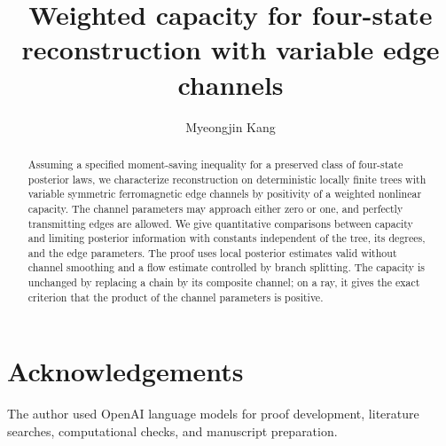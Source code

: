 \documentclass[11pt,reqno]{amsart}
\title[Weighted capacity for four-state reconstruction]{Weighted capacity for four-state reconstruction with variable edge channels}
\author{Myeongjin Kang}
\date{}
\numberwithin{equation}{section}
\theoremstyle{definition}
\theoremstyle{remark}
\begin{document}
\begin{abstract}
Assuming a specified moment-saving inequality for a preserved class of
four-state posterior laws, we characterize reconstruction on deterministic
locally finite trees with variable symmetric ferromagnetic edge channels
by positivity of a weighted nonlinear capacity. The channel parameters
may approach either zero or one, and perfectly transmitting edges are
allowed. We give quantitative comparisons between capacity and limiting
posterior information with constants independent of the tree, its degrees,
and the edge parameters. The proof uses local posterior estimates valid
without channel smoothing and a flow estimate controlled by branch
splitting. The capacity is unchanged by replacing a chain by its composite
channel; on a ray, it gives the exact criterion that the product of the
channel parameters is positive.
\end{abstract}
\maketitle





\section*{Acknowledgements}
The author used OpenAI language models for proof development, literature
searches, computational checks, and manuscript preparation.
\begingroup\small

\endgroup
\end{document}
